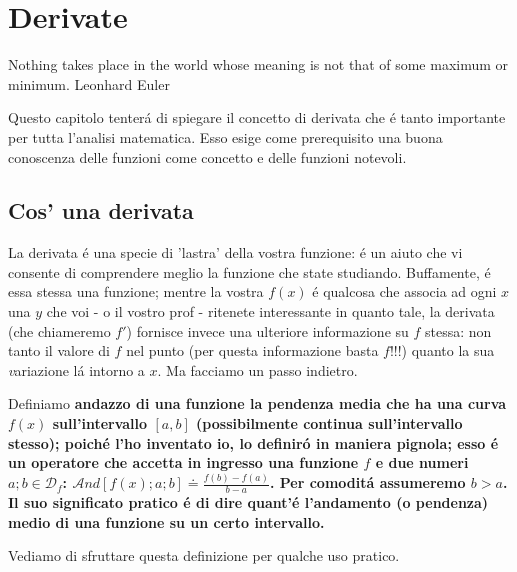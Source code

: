 \label{derivate}
\chapter{Derivate}

\citazioneinizioparagrafo
  {Nothing takes place in the world whose meaning is not that of some maximum or minimum.}
  {Leonhard Euler}

Questo capitolo tenter\'a di spiegare il concetto di derivata che \'e tanto importante per tutta l'analisi matematica.
Esso esige come prerequisito una buona conoscenza delle funzioni come concetto e delle funzioni notevoli.


\section{Cos' \egrave una derivata}

La derivata \'e una specie di 'lastra' della vostra funzione: \'e un aiuto che vi consente di comprendere meglio la
funzione che state studiando. Buffamente, \'e essa stessa una funzione; mentre la vostra $f(x)$ \'e qualcosa che associa
ad ogni $x$ una $y$ che voi - o il vostro prof - ritenete interessante in quanto tale, la derivata (che chiameremo $f'$)
fornisce invece una ulteriore informazione su $f$ stessa: non tanto il valore di $f$ nel punto (per questa informazione
basta $f$!!!) quanto la sua {\emph variazione} l\'a intorno a $x$. Ma facciamo un passo indietro.


\label{andazzo}
\begin{definizione}[Andazzo] Definiamo \bf{andazzo} di una funzione la pendenza media che ha una curva $f(x)$ sull'intervallo 
      $[a,b]$ (possibilmente continua sull'intervallo stesso); poich\'e l'ho inventato io, lo definir\'o in maniera pignola; esso
      \'e un operatore che accetta in ingresso una funzione $f$ e due numeri $a;b \in \mathcal{D}_f$: $\mathcal{A}nd[f(x);a;b] \doteq \frac{f(b)-f(a)}{b-a}$.
      Per comodit\'a assumeremo $b>a$. Il suo significato pratico \'e di dire quant'\'e
       l'andamento (o pendenza) medio di una funzione su un certo intervallo.
\end{definizione}

Vediamo di sfruttare questa definizione per qualche uso pratico. 

